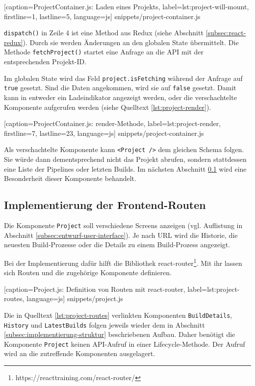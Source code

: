 
  [caption={ProjectContainer.js: Laden eines Projekts},
  label={lst:project-will-mount},
  firstline=1,
  lastline=5,
  language=js]
  {snippets/project-container.js}

\texttt{dispatch()} in Zeile 4 ist eine Method aus Redux (siehe Abschnitt \ref{subsec:react-redux}). Durch sie werden Änderungen an den globalen State übermittelt. Die Methode \texttt{fetchProject()} startet eine Anfrage an die API mit der entsprechenden Projekt-ID.

Im globalen State wird das Feld \texttt{project.isFetching} während der Anfrage auf \texttt{true} gesetzt. Sind die Daten angekommen, wird sie auf \texttt{false} gesetzt. Damit kann in entweder ein Ladeindikator angezeigt werden, oder die verschachtelte Komponente aufgerufen werden (siehe Quelltext \ref{lst:project-render}).


  [caption={ProjectContainer.js: render-Methode},
  label={lst:project-render},
  firstline=7,
  lastline=23,
  language=js]
  {snippets/project-container.js}

Als verschachtelte Komponente kann \texttt{<Project />} dem gleichen Schema folgen. Sie würde dann  dementsprechend nicht das Projekt abrufen, sondern stattdessen eine Liste der Pipelines oder letzten Builds. Im nächsten Abschnitt \ref{subsec:react-routes} wird eine Besonderheit dieser Komponente behandelt.

\subsection{Implementierung der Frontend-Routen}
\label{subsec:react-routes}

Die Komponente \texttt{Project} soll verschiedene Screens anzeigen (vgl. Auflistung in Abschnitt \ref{subsec:entwurf-user-interface}). Je nach URL wird die Historie, die neuesten Build-Prozesse oder die Details zu einem Build-Prozess angezeigt.

Bei der Implementierung dafür hilft die Bibliothek react-router\footnote{https://reacttraining.com/react-router/}. Mit ihr lassen sich Routen und die zugehörige Komponente definieren.


  [caption={Project.js: Definition von Routen mit react-router},
  label={lst:project-routes},
  language=js]
  {snippets/project.js}

Die in Quelltext \ref{lst:project-routes} verlinkten Komponenten \texttt{BuildDetails}, \texttt{History} und \texttt{LatestBuilds} folgen jeweils wieder dem in Abschnitt \ref{subsec:implementierung-struktur} beschriebenen Aufbau. Daher benötigt die Komponente \texttt{Project} keinen API-Aufruf in einer Lifecycle-Methode. Der Aufruf wird an die zutreffende Komponenten ausgelagert.

